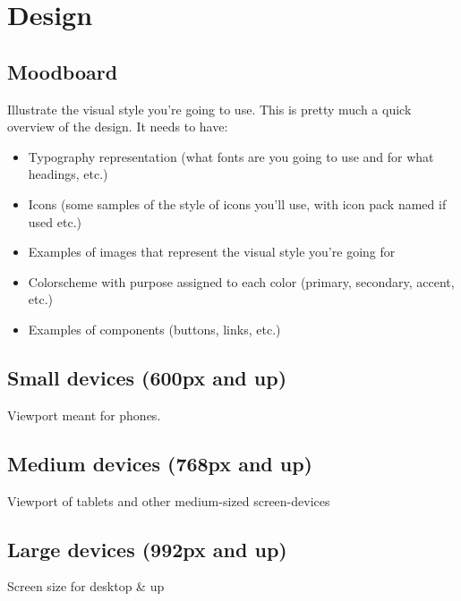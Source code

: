 \section{Design}
\subsection{Moodboard}
Illustrate the visual style you're going to use.
This is pretty much a quick overview of the design.
It needs to have:

\begin{itemize}
  \item{Typography representation (what fonts are you going to use and for what headings, etc.)}
  \item{Icons (some samples of the style of icons you'll use, with icon pack named if used etc.)}
  \item{Examples of images that represent the visual style you're going for}
  \item{Colorscheme with purpose assigned to each color (primary, secondary, accent, etc.)}
  \item{Examples of components (buttons, links, etc.)}
\end{itemize}


\subsection{Small devices (600px and up)}
Viewport meant for phones.

\subsection{Medium devices (768px and up)}
Viewport of tablets and other medium-sized screen-devices

\subsection{Large devices (992px and up)}
Screen size for desktop \& up

\clearpage

